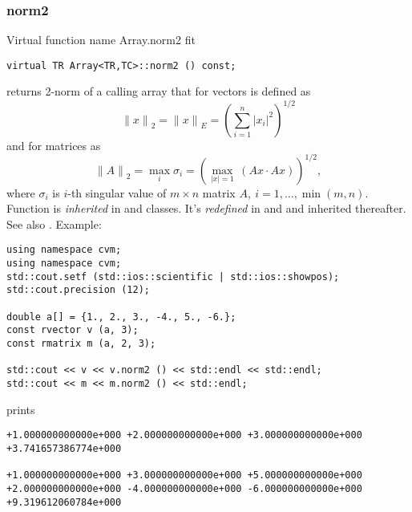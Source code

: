 \subsubsection{norm2}
Virtual function%
\pdfdest name {Array.norm2} fit
\begin{verbatim}
virtual TR Array<TR,TC>::norm2 () const;
\end{verbatim}
returns  2-norm of a calling array that for vectors
is defined as
\begin{equation*}
{\|x\|}_2={\|x\|}_E=\left(\sum_{i=1}^{n} |x_i|^2\right)^{1/2}
\end{equation*}
and for matrices as
\begin{equation*}
{\|A\|}_2=\max_i\sigma_i = \left(\max_{|x|=1}\,
(Ax\cdot Ax)\right)^{1/2},
\end{equation*}
where $\sigma_i$ is  \hbox{$i$-th} singular value
of $m\times n$ matrix $A,\ i=1,\dots,\min(m,n)$.
Function is \emph{inherited} in
 and  classes.
It's \emph{redefined} in
 and 
and inherited thereafter.
See also .
Example:
\begin{Verbatim}
using namespace cvm;
using namespace cvm;
std::cout.setf (std::ios::scientific | std::ios::showpos);
std::cout.precision (12);

double a[] = {1., 2., 3., -4., 5., -6.};
const rvector v (a, 3);
const rmatrix m (a, 2, 3);

std::cout << v << v.norm2 () << std::endl << std::endl;
std::cout << m << m.norm2 () << std::endl;
\end{Verbatim}
prints
\begin{Verbatim}
+1.000000000000e+000 +2.000000000000e+000 +3.000000000000e+000
+3.741657386774e+000

+1.000000000000e+000 +3.000000000000e+000 +5.000000000000e+000
+2.000000000000e+000 -4.000000000000e+000 -6.000000000000e+000
+9.319612060784e+000
\end{Verbatim}
\newpage


